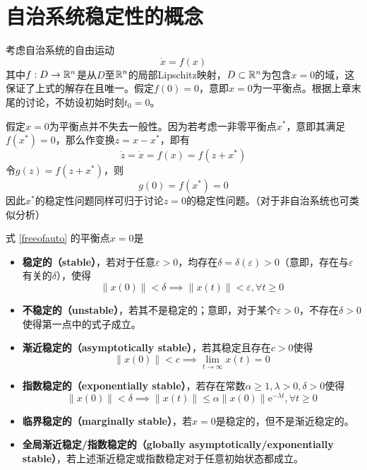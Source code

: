 \section{自治系统稳定性的概念}\label{2Aref}
考虑自治系统的自由运动
\begin{equation}\label{freeofauto}
  \dot{x}=f(x)
\end{equation}
其中$f:D\to\mathbb{R}{}^n$是从$D$至$\mathbb{R}{}^n$的局部Lipschitz映射，$D\subset\mathbb{R}{}^n$为包含$x=0$的域，这保证了上式的解存在且唯一。假定$f(0)=0$，意即$x=0$为一平衡点。根据上章末尾的讨论，不妨设初始时刻$t_0=0$。
\begin{note}
  假定$x=0$为平衡点并不失去一般性。因为若考虑一非零平衡点$x^\ast$，意即其满足$f(x^\ast)=0$，那么作变换$z=x-x^\ast$，即有\[\dot{z}=\dot{x}=f(x)=f(z+x^\ast)\]令$g(z)=f(z+x^\ast)$，则\[g(0)=f(x^\ast)=0\]因此$x^\ast$的稳定性问题同样可归于讨论$z=0$的稳定性问题。（对于非自治系统也可类似分析）
\end{note}
\begin{definition}[自治系统的稳定性]
  式 \eqref{freeofauto} 的平衡点$x=0$是
  \begin{itemize}[leftmargin=1em]
    \item {\bf 稳定的（stable）}，若对于任意$\varepsilon>0$，均存在$\delta=\delta(\varepsilon)>0$（意即，存在与$\varepsilon$有关的$\delta$），使得
    \[\|x(0)\|<\delta\implies \|x(t)\|<\varepsilon,\forall t\ge 0\]
    \item {\bf 不稳定的（unstable）}，若其不是稳定的；意即，对于某个$\varepsilon>0$，不存在$\delta>0$使得第一点中的式子成立。
    \item {\bf 渐近稳定的（asymptotically stable）}，若其稳定且存在$c>0$使得\[\|x(0)\|<c\implies \lim_{t\to\infty}x(t)=0\]
    \item {\bf 指数稳定的（exponentially stable）}，若存在常数$\alpha\ge1,\lambda>0,\delta>0$使得\[\|x(0)\|<\delta\implies \|x(t)\|\le\alpha\|x(0)\|\mathrm{e}^{-\lambda t},\forall t\ge 0\]
    \item {\bf 临界稳定的（marginally stable）}，若$x=0$是稳定的，但不是渐近稳定的。
    \item {\bf 全局渐近稳定/指数稳定的（globally asymptotically/exponentially stable）}，若上述渐近稳定或指数稳定对于任意初始状态都成立。
  \end{itemize}
\end{definition}


